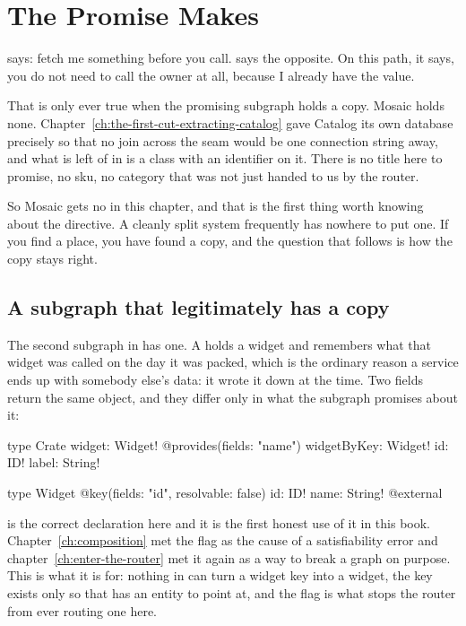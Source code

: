 \section{The Promise  Makes}
\label{sec:ch11-the-promise-provides-makes}
%

 says: fetch me something before you call. 
says the opposite. On this path, it says, you do not need to call the owner at
all, because I already have the value.

%
That is only ever true when the promising subgraph holds a copy. Mosaic holds
none. Chapter~\ref{ch:the-first-cut-extracting-catalog} gave Catalog its own
database precisely so that no join across the seam would be one connection
string away, and what is left of  in  is a class
with an identifier on it. There is no title here to promise, no sku, no
category that was not just handed to us by the router.

So Mosaic gets no  in this chapter, and that is the first thing
worth knowing about the directive. A cleanly split system frequently has
nowhere to put one. If you find a place, you have found a copy, and the
question that follows is how the copy stays right.

\subsection*{A subgraph that legitimately has a copy}

%
The second subgraph in  has one. A
 holds a widget and remembers what that widget was called on the
day it was packed, which is the ordinary reason a service ends up with somebody
else's data: it wrote it down at the time. Two fields return the same object,
and they differ only in what the subgraph promises about it:

\begin{graphqlsdl}[fontsize=\footnotesize]
type Crate {
  widget: Widget! @provides(fields: "name")
  widgetByKey: Widget!
  id: ID!
  label: String!
}

type Widget @key(fields: "id", resolvable: false) {
  id: ID!
  name: String! @external
}
\end{graphqlsdl}

%
 is the correct declaration here and it is the first
honest use of it in this book. Chapter~\ref{ch:composition} met the flag as the
cause of a satisfiability error and
chapter~\ref{ch:enter-the-router} met it again as a way to break a graph on
purpose. This is what it is for: nothing in  can turn a widget key
into a widget, the key exists only so that  has an entity to
point at, and the flag is what stops the router from ever routing one here.


